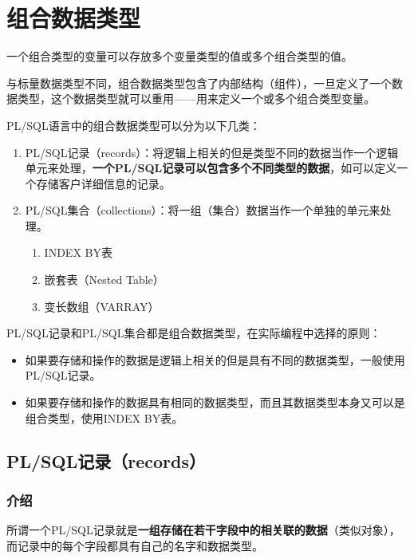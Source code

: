 \documentclass[11pt, a4paper, oneside, UTF8]{ctexbook}
\let\kaishu\relax %
\begin{document}
\chapter{组合数据类型}
一个组合类型的变量可以存放多个变量类型的值或多个组合类型的值。

与标量数据类型不同，组合数据类型包含了内部结构（组件），一旦定义了一个数据类型，这个数据类型就可以重用——用来定义一个或多个组合类型变量。

PL/SQL语言中的组合数据类型可以分为以下几类：
\begin{enumerate}
  \item PL/SQL记录（records）：将逻辑上相关的但是类型不同的数据当作一个逻辑单元来处理，{\bfseries\kaishu 一个PL/SQL记录可以包含多个不同类型的数据}，如可以定义一个存储客户详细信息的记录。
  \item PL/SQL集合（collections）：将一组（集合）数据当作一个单独的单元来处理。
  \begin{enumerate}
    \item INDEX BY表
    \item 嵌套表（Nested Table）
    \item 变长数组（VARRAY）
  \end{enumerate}
\end{enumerate}

PL/SQL记录和PL/SQL集合都是组合数据类型，在实际编程中选择的原则：
\begin{itemize}
  \item 如果要存储和操作的数据是逻辑上相关的但是具有不同的数据类型，一般使用PL/SQL记录。
  \item 如果要存储和操作的数据具有相同的数据类型，而且其数据类型本身又可以是组合类型，使用INDEX BY表。
\end{itemize}

\section{PL/SQL记录（records）}
\subsection{介绍}
所谓一个PL/SQL记录就是{\bfseries\kaishu 一组存储在若干字段中的相关联的数据}（类似对象），而记录中的每个字段都具有自己的名字和数据类型。
\end{document}
